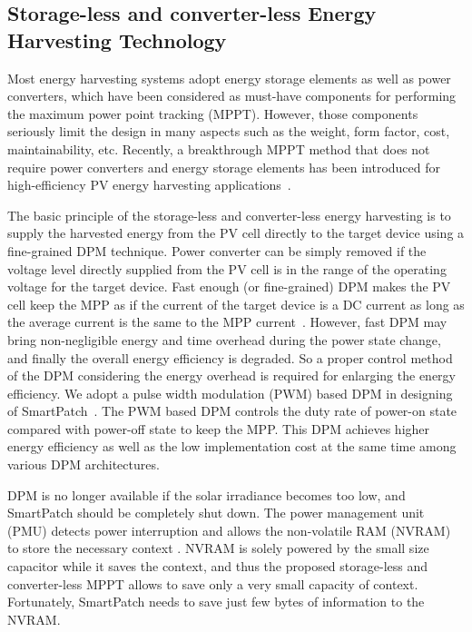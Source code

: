 \documentclass[journal]{IEEEtran}
\begin{document}
\subsection{Storage-less and converter-less Energy Harvesting Technology}
Most energy harvesting systems adopt energy storage elements as well as power converters, which have been considered as must-have components for performing the maximum power point tracking (MPPT). However, those components seriously limit the design in many aspects such as the weight, form factor, cost, maintainability, etc. Recently, a breakthrough MPPT method that does not require power converters and energy storage elements has been introduced for high-efficiency PV energy harvesting applications~\cite{Wang:ASPDAC14}.

The basic principle of the storage-less and converter-less energy harvesting is to supply the harvested energy from the PV cell directly to the target device using a fine-grained DPM technique. %
Power converter can be simply removed if the voltage level directly supplied from the PV cell is in the range of the operating voltage for the target device. 
Fast enough (or fine-grained) DPM makes the PV cell keep the MPP as if the current of the target device is a DC current as long as the average current is the same to the MPP current~\cite{Wang:ASPDAC14}. However, fast DPM may bring non-negligible energy and time overhead during the power state change, and finally the overall energy efficiency is degraded. So a proper control method of the DPM considering the energy overhead is required for enlarging the energy efficiency. We adopt a pulse width modulation (PWM) based DPM in designing of SmartPatch~\cite{Lee:ASPDAC15}. The PWM based DPM controls the duty rate of power-on state compared with power-off state to keep the MPP. This DPM achieves higher energy efficiency as well as the low implementation cost at the same time among various DPM architectures.

DPM is no longer available if the solar irradiance becomes too low, and SmartPatch should be completely shut down. The power management unit (PMU) detects power interruption and allows the non-volatile RAM (NVRAM) to store the necessary context \cite{Balsamo:TCAD16}. NVRAM is solely powered by the small size capacitor while it saves the context, and thus the proposed storage-less and converter-less MPPT allows to save only a very small capacity of context. Fortunately, SmartPatch needs to save just few bytes of information to the NVRAM.
\end{document}

